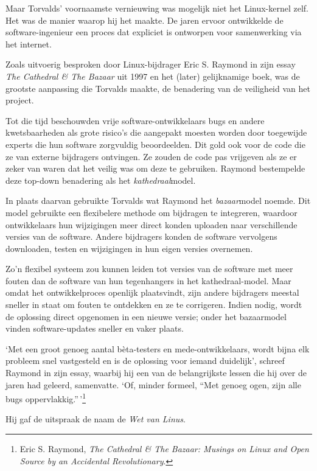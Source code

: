 \documentclass[
  a5paper,
  smalldemyvopaper,11pt,twoside,onecolumn,openright,extrafontsizes,
hidelinks]{memoir}
\begin{document}
Maar Torvalds' voornaamste vernieuwing was mogelijk niet het
Linux-kernel zelf. Het was de manier waarop hij het maakte. De jaren
ervoor ontwikkelde de software-ingenieur een proces dat expliciet is
ontworpen voor samenwerking via het internet.

Zoals uitvoerig besproken door Linux-bijdrager Eric S. Raymond in zijn
essay \emph{The Cathedral \& The Bazaar} uit 1997 en het (later)
gelijknamige boek, was de grootste aanpassing die Torvalds maakte, de
benadering van de veiligheid van het project.

Tot die tijd beschouwden vrije software-ontwikkelaars bugs en andere
kwetsbaarheden als grote risico's die aangepakt moesten worden door
toegewijde experts die hun software zorgvuldig beoordeelden. Dit gold
ook voor de code die ze van externe bijdragers ontvingen. Ze zouden de
code pas vrijgeven als ze er zeker van waren dat het veilig was om deze
te gebruiken. Raymond bestempelde deze top-down benadering als het
\emph{kathedraal}model.

In plaats daarvan gebruikte Torvalds wat Raymond het \emph{bazaar}model
noemde. Dit model gebruikte een flexibelere methode om bijdragen te
integreren, waardoor ontwikkelaars hun wijzigingen meer direct konden
uploaden naar verschillende versies van de software. Andere bijdragers
konden de software vervolgens downloaden, testen en wijzigingen in hun
eigen versies overnemen.

Zo'n flexibel systeem zou kunnen leiden tot versies van de software met
meer fouten dan de software van hun tegenhangers in het
kathedraal-model. Maar omdat het ontwikkelproces openlijk plaatsvindt,
zijn andere bijdragers meestal sneller in staat om fouten te ontdekken
en ze te corrigeren. Indien nodig, wordt de oplossing direct opgenomen
in een nieuwe versie; onder het bazaarmodel vinden software-updates
sneller en vaker plaats.

`Met een groot genoeg aantal bèta-testers en mede-ontwikkelaars, wordt
bijna elk probleem snel vastgesteld en is de oplossing voor iemand
duidelijk', schreef Raymond in zijn essay, waarbij hij een van de
belangrijkste lessen die hij over de jaren had geleerd, samenvatte. `Of,
minder formeel, ``Met genoeg ogen, zijn alle bugs
oppervlakkig.''\,'\footnote{\hspace{0pt}Eric S. Raymond, \emph{The
  Cathedral \& The Bazaar: Musings on Linux and Open Source by an
  Accidental Revolutionary}.}

Hij gaf de uitspraak de naam de \emph{Wet van Linus}.
\end{document}
